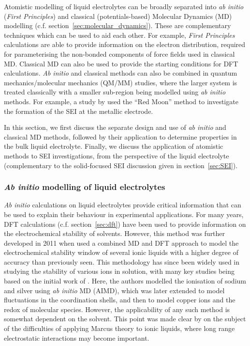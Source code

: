 \documentclass[../main.tex]{subfiles}
\begin{document}
Atomistic modelling of liquid electrolytes can be broadly separated into \textit{ab initio} (\textit{First Principles}) and classical (potentials-based) Molecular Dynamics (MD) modelling (c.f. section~\ref{sec:molecular_dynamics}). These are complementary techniques which can be used to aid each other. For example, \textit{First Principles} calculations are able to provide information on the electron distribution, required for parameterising the non-bonded components of force fields used in classical MD. Classical MD can also be used to provide the starting conditions for DFT calculations. \textit{Ab initio} and classical methods can also be combined in quantum mechanics/molecular mechanics (QM/MM) studies, where the larger system is treated classically with a smaller sub-region being modelled using \textit{ab initio} methods. For example, a study by \citeauthor{Fujie_2018} used the ``Red Moon'' method to investigate the formation of the SEI at the metallic electrode.\cite{Fujie_2018}

In this section, we first discuss the separate design and use of \textit{ab initio} and classical MD methods, followed by their application to determine properties in the bulk liquid electrolyte. Finally, we discuss the application of atomistic methods to SEI investigations, from the perspective of the liquid electrolyte (complementary to the solid-focused SEI discussion given in section~\ref{sec:SEI}).

\subsubsection{\textit{Ab initio} modelling of liquid electrolytes}
\textit{Ab initio} calculations on liquid electrolytes provide critical information that can be used to explain their behaviour in experimental applications. For many years, DFT calculations (c.f. section~\ref{sec:dft}) have been used to provide information on the electrochemical stability of solvents.\cite{Koch_1996} However, this method was further developed in 2011 when \citeauthor{ong2011electrochemical} used a combined MD and DFT approach to model the electrochemical stability window of several ionic liquids with a higher degree of accuracy than previously seen.\cite{ong2011electrochemical} This methodology has since been widely used in studying the stability of various ions in solution, with many key studies being based on the initial work of \citeauthor{vuilleumier2001electronic}.\cite{vuilleumier2001electronic} Here, the authors modelled the ionisation of sodium and silver using \textit{ab initio} MD (AIMD), which was later extended to model fluctuations in the coordination shells\cite{blumberger2006diabatic}, and then to model copper\cite{blumberger2004electronic} ions and the redox of molecular species.\cite{vandevondele2006solvent} However, the applicability of any such method is somewhat dependent on the solvent. This point was made clear by \citeauthor{lynden2007can} on the subject of the difficulties of applying Marcus theory to ionic liquids, where long range electrostatic interactions may become important.\cite{lynden2007can}
\end{document}

